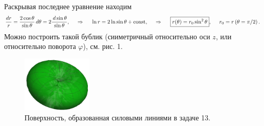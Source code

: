 Раскрывая последнее уравнение находим
\begin{equation*}
    \frac{d r}{r} = \frac{2 \cos \theta}{\sin \theta}\, d \theta = 2 \frac{\, d \sin \theta}{\sin \theta},
    \hspace{0.5cm} \Rightarrow \hspace{0.5cm}
    \ln r = 2 \ln \sin \theta + \text{const},
    \hspace{0.5cm} \Rightarrow \hspace{0.5cm}
    \boxed{
    r(\theta) = r_0 \sin^2 \theta
    }
    , \hspace{5 mm} r_0 = r\left(\theta=\pi/2\right).
\end{equation*}
Можно построить такой бублик (сииметричный относительно оси $z$, или относительно поворота $\varphi$), см. рис. 1.
\begin{figure}[ht]
    \centering
    \includegraphics[width=0.3\textwidth]{figures/t13.png}
    \caption{Поверхность, образованная силовыми линиями в задаче 13.}
\end{figure}



